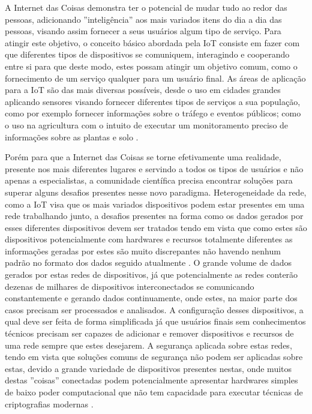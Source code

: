 \documentclass[ti,table]{texufpel} %
\begin{document}
A Internet das Coisas demonstra ter o potencial de mudar tudo ao redor das pessoas, adicionando ''inteligência'' aos mais variados itens do dia a dia das pessoas, visando assim fornecer a seus usuários algum tipo de serviço. Para atingir este objetivo, o conceito básico abordada pela IoT consiste em fazer com que diferentes tipos de dispositivos se comuniquem, interagindo e cooperando entre si para que deste modo, estes possam atingir um objetivo comum, como o fornecimento de um serviço qualquer para um usuário final. As áreas de aplicação para a IoT são das mais diversas possíveis, desde o uso em cidades grandes aplicando sensores visando fornecer diferentes tipos de serviços a sua população, como por exemplo fornecer informações sobre o tráfego e eventos públicos; como o uso na agricultura com o intuito de executar um monitoramento preciso de  informações sobre as plantas e solo \cite{gonccalves2017research}. 

  

Porém para que a Internet das Coisas se torne efetivamente uma realidade, presente nos mais diferentes lugares e servindo a todos os tipos de usuários e não apenas a especialistas, a comunidade científica precisa encontrar soluções para superar alguns desafios presentes nesse novo paradigma. Heterogeneidade da rede, como a IoT visa que os mais variados dispositivos podem estar presentes em uma rede trabalhando junto, a desafios presentes na forma como os dados gerados por esses diferentes dispositivos devem ser tratados tendo em vista que como estes são dispositivos potencialmente com hardwares e recursos totalmente diferentes as informações geradas por estes são muito discrepantes não havendo nenhum padrão no formato dos dados seguido atualmente \cite{agrawal2013survey}. O grande volume de dados gerados por estas redes de dispositivos, já que potencialmente as redes conterão dezenas de milhares de dispositivos interconectados se comunicando constantemente e gerando dados continuamente, onde estes, na maior parte dos casos precisam ser processados e analisados. A configuração desses dispositivos, a qual deve ser feita de forma simplificada já que usuários finais sem conhecimentos técnicos precisam ser capazes de adicionar e remover dispositivos e recursos de uma rede sempre que estes desejarem. A segurança aplicada sobre estas redes, tendo em vista que soluções comuns de segurança não podem ser aplicadas sobre estas,  devido a grande variedade de dispositivos presentes nestas, onde muitos destas ''coisas'' conectadas podem potencialmente apresentar hardwares simples de baixo poder computacional que não tem capacidade para executar técnicas de criptografias modernas \cite{agrawal2013survey}. 
\end{document}

